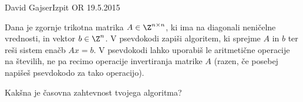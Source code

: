 \begin{naloga}{David Gajser}{Izpit OR 19.5.2015}
\begin{vprasanje}
Dana je zgornje trikotna matrika $A \in \Z^{n \times n}$,
ki ima na diagonali neničelne vred\-no\-sti,
in vektor $b \in \Z^n$.
V psevdokodi zapiši algoritem, ki sprejme $A$ in $b$
ter reši sistem enačb $Ax = b$.
V psevdokodi lahko uporabiš le aritmetične operacije na številih,
ne pa recimo operacije invertiranja matrike $A$
(razen, če posebej napišeš psevdokodo za tako operacijo).

Kakšna je časovna zahtevnost tvojega algoritma?
\end{vprasanje}
\begin{odgovor}
\end{odgovor}
\end{naloga}
